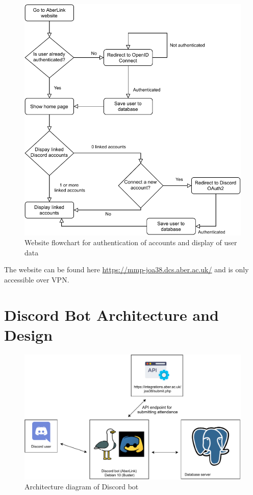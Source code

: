 \begin{figure}[H]
	\centering
	\includegraphics[width=0.8\linewidth]{Figures/website-flowchart}
	\caption{Website flowchart for authentication of accounts and display of user data}
	\label{fig:architecture-web-flow}
\end{figure}

The website can be found here \href{https://mmp-joa38.dcs.aber.ac.uk/}{https://mmp-joa38.dcs.aber.ac.uk/} and is only accessible over VPN.

\section{Discord Bot Architecture and Design}\label{sec2:discord}
\begin{figure}[H]
	\centering
	\includegraphics[width=0.9\linewidth]{Figures/Architecture-discord}
	\caption{Architecture diagram of Discord bot}
	\label{fig:architecture-dis}
\end{figure}

